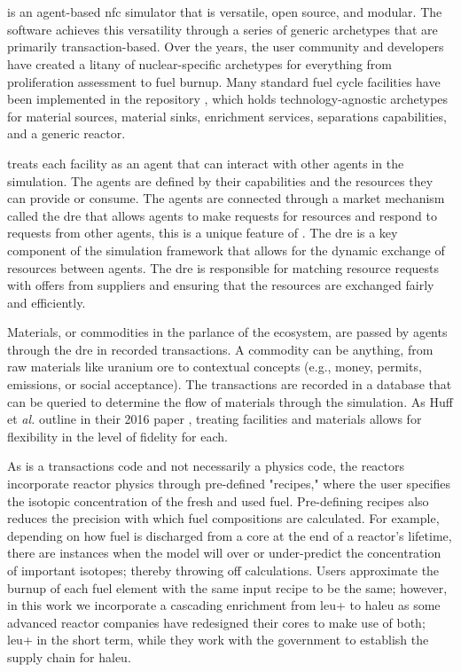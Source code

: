 \section{\cyclus}
\label{sec:cyclus}
\cyclus is an agent-based \gls{nfc} simulator that is versatile, open source,
and modular. The software achieves this versatility through a series of generic
archetypes that are primarily transaction-based. Over the years, the user
community and developers have created a litany of nuclear-specific archetypes
for everything from proliferation assessment to fuel burnup. Many standard fuel
cycle facilities have been implemented in the \cycamore repository
\cite{Carlsen_cycamore_2014}, which holds technology-agnostic archetypes for
material sources, material sinks, enrichment services, separations
capabilities, and a generic reactor.

\cyclus treats each facility as an agent that can interact with other agents in
the simulation. The agents are defined by their capabilities and the resources
they can provide or consume. The agents are connected through a market
mechanism called the \gls{dre} that allows agents to make requests for
resources and respond to requests from other agents, this is a unique feature
of \cyclus. The \gls{dre} is a key component of the \cyclus simulation
framework that allows for the dynamic exchange of resources between agents. The
\gls{dre} is responsible for matching resource requests with offers from
suppliers and ensuring that the resources are exchanged fairly and efficiently.

Materials, or commodities in the parlance of the \cyclus ecosystem, are passed
by agents through the \gls{dre} in recorded transactions. A commodity can be
anything, from raw materials like uranium ore to contextual concepts (e.g.,
money, permits, emissions, or social acceptance). The transactions are recorded
in a database that can be queried to determine the flow of materials through
the simulation. As Huff et \textit{al.} outline in their 2016 paper
\cite{huff_cyclus_intro_2016}, treating facilities and materials allows for
flexibility in the level of fidelity for each.

As \cyclus is a transactions code and not necessarily a physics code,
the reactors incorporate reactor physics through pre-defined "recipes,"
where the user specifies the isotopic concentration of the fresh and
used fuel. Pre-defining recipes also reduces the precision with which
fuel compositions are calculated. For example, depending on how fuel is
discharged from a core at the end of a reactor's lifetime, there are
instances when the model will over or under-predict the concentration of
important isotopes; thereby throwing off calculations. Users approximate
the burnup of each fuel element with the same input recipe to be the
same; however, in this work we incorporate a cascading enrichment from
\gls{leu+} to \gls{haleu} as some advanced reactor companies have
redesigned their cores to make use of both; \gls{leu+} in the short term,
while they work with the government to establish the supply chain for
\gls{haleu}.


